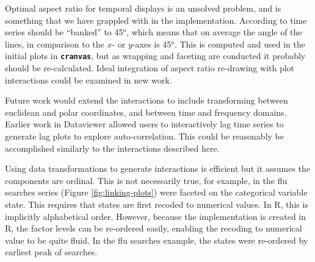 \documentclass[12pt]{article}
\begin{document}
Optimal aspect ratio for temporal displays is an unsolved problem,
and is something that we have grappled with in the implementation.
According to \citep{cleveland1993} time series should be ``banked''
to 45$^o$, which means that on average the angle of the lines, in
comparison to the $x$- or $y$-axes is 45$^o$. This is computed and
used in the initial plots in \texttt{\textbf{cranvas}}, but as
wrapping and faceting are conducted it probably should be
re-calculated. Ideal integration of aspect ratio re-drawing with
plot interactions could be examined in new work.


Future work would extend the interactions to include transforming between euclidean and polar coordinates, and between time and frequency domains. Earlier work in Dataviewer \citep{BAHM88} allowed users to interactively lag time series to generate lag plots to explore auto-correlation. This could be reasonably be accomplished similarly to the interactions described here.


Using data transformations to generate interactions is efficient but it assumes the components are ordinal. This is not necessarily true, for example, in the flu searches series (Figure \ref{fig:linking-plots}) were faceted on the categorical variable state. This requires that states are first recoded to numerical values. In R, this is implicitly alphabetical order. However, because the implementation is created in R, the factor levels can be re-ordered easily, enabling the recoding to numerical value to be quite fluid. In the flu searches example, the states were re-ordered by earliest peak of searches.
\end{document}
